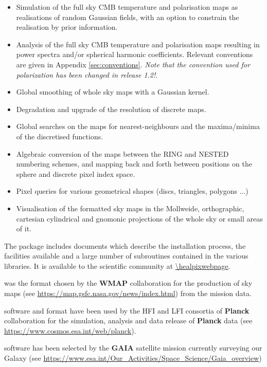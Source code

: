 \documentclass[12pt,twoside]{article}
\begin{document}
\begin{itemize}
\item Simulation of the full sky CMB temperature and polarisation maps
as realisations of random Gaussian fields, with an option to constrain
the realisation by prior information.
\item Analysis of the full sky CMB temperature and polarisation maps
resulting in power spectra and/or spherical harmonic
coefficients. Relevant conventions are given in Appendix \ref{sec:conventions}.
{\large {\em Note that the convention used for polarization has been changed in
release 1.2!}}.
\item Global smoothing of whole sky maps with a Gaussian kernel.
\item Degradation and upgrade of the resolution of discrete maps.
\item Global searches on the maps for nearest-neighbours and 
the maxima/minima of the discretised functions.
\item Algebraic conversion of the maps between the RING and NESTED numbering
schemes, and mapping back and forth between  positions on the sphere and 
discrete pixel index space.
\item Pixel queries for various geometrical shapes (discs, triangles, polygons ...)
\item Visualisation of the \healpix formatted sky maps in the
Mollweide, orthographic, cartesian cylindrical and gnomonic
projections of the whole sky or small areas of it. 
\end{itemize}

The package includes documents which describe the installation
process, the facilities available and a large number of 
subroutines contained in the various libraries. It is
available to the scientific community  at \url{\healpixwebpage}.

\healpix was the format chosen by the \textbf{WMAP}
collaboration 
for the production
of sky maps (see 
\url{https://map.gsfc.nasa.gov/news/index.html})
 from the mission data. 

\healpix software and format have been used by the HFI and LFI consortia of \textbf{Planck}
collaboration for the simulation, analysis and data release of \textbf{Planck} data
(see \url{https://www.cosmos.esa.int/web/planck}).

\healpix software has been selected by the \textbf{GAIA} satellite mission currently surveying our Galaxy
(see \url{https://www.esa.int/Our_Activities/Space_Science/Gaia_overview})
\end{document}
